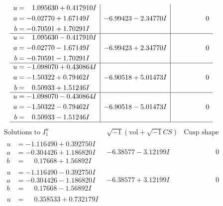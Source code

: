 \documentclass[1p]{elsarticle_modified}
\theoremstyle{definition}
\newcommand{\I}{\sqrt{-1}}
\begin{document}
$$\begin{array}{c|c|c}
\begin{aligned}
u &= \phantom{-}1.095630 + 0.417910 I \\
a &= -0.02770 + 1.67149 I \\
b &= -0.70591 + 1.70291 I\end{aligned}
 & -6.99423 - 2.34770 I & \phantom{-0.000000 } 0 \\ \hline\begin{aligned}
u &= \phantom{-}1.095630 - 0.417910 I \\
a &= -0.02770 - 1.67149 I \\
b &= -0.70591 - 1.70291 I\end{aligned}
 & -6.99423 + 2.34770 I & \phantom{-0.000000 } 0 \\ \hline\begin{aligned}
u &= -1.098070 + 0.430864 I \\
a &= -1.50322 + 0.79462 I \\
b &= \phantom{-}0.50933 + 1.51246 I\end{aligned}
 & -6.90518 + 5.01473 I & \phantom{-0.000000 } 0 \\ \hline\begin{aligned}
u &= -1.098070 - 0.430864 I \\
a &= -1.50322 - 0.79462 I \\
b &= \phantom{-}0.50933 - 1.51246 I\end{aligned}
 & -6.90518 - 5.01473 I & \phantom{-0.000000 } 0\\
 \hline 
 \end{array}$$\newpage$$\begin{array}{c|c|c}  
\text{Solutions to }I^u_{1}& \I (\text{vol} + \sqrt{-1}CS) & \text{Cusp shape}\\
 \hline 
\begin{aligned}
u &= -1.116490 + 0.392750 I \\
a &= -0.304426 + 1.186820 I \\
b &= \phantom{-}0.17668 + 1.56892 I\end{aligned}
 & -6.38577 - 3.12199 I & \phantom{-0.000000 } 0 \\ \hline\begin{aligned}
u &= -1.116490 - 0.392750 I \\
a &= -0.304426 - 1.186820 I \\
b &= \phantom{-}0.17668 - 1.56892 I\end{aligned}
 & -6.38577 + 3.12199 I & \phantom{-0.000000 } 0 \\ \hline\begin{aligned}
u &= \phantom{-}0.358533 + 0.732179 I \\

\end{aligned}
\end{array}$$
\end{document}
